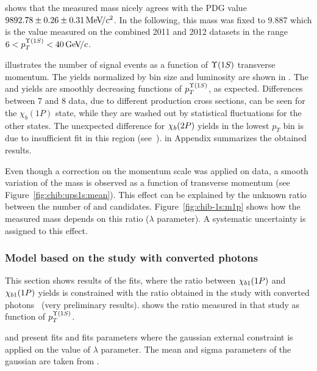  shows that the measured \chiboneOneP mass
nicely agrees with the PDG value $9892.78 \pm 0.26 \pm 0.31 {\mathrm{\,Me\kern -0.1em V\!/}c^2}$. In
the following, this mass was fixed to 9.887 \gevcc which is the value 
measured on the combined 2011 and 2012 datasets in the range $6<p_T^{\Y1S}<40\gevc$.


 illustrates the number of signal events as
a function of $\Y1S$ transverse momentum. The yields
normalized by bin size and luminosity are shown in
. The \chibOneP and \chibThreeP yields
are smoothly decreasing functions of $p_T^{\Y1S}$, as expected. Differences between 7 and 8\tev
data, due to different production cross sections, can be seen for the
$\chi_b(1P)$ state, while they are washed out by statistical fluctuations for
the other states. The unexpected difference for $\chi_{b}(2P)$ yields in the lowest
$p_T$ bin is due to insufficient fit in this region (see~).
 in Appendix summarizes the
obtained results.



Even though a correction on the momentum scale was applied on data, a smooth variation of the
\chiboneOneP mass is observed as a function of transverse momentum (see
Figure~\ref{fig:chib:ups1s:mean}). This effect can be explained by the unknown
ratio between the number of \chiboneOneP and \chiboneTwoP candidates.
Figure~\ref{fig:chib-1s:m1p} shows how the measured mass depends on this ratio
($\lambda$ parameter). A systematic uncertainty is assigned to this effect.




\subsubsection{Model based on the study with converted photons}
This section shows results of the fits, where the ratio between
$\chi_{b 1}(1P)$ and $\chi_{b 1}(1P)$ yields is constrained with the ratio obtained
in the study with converted photons~\cite{Lespinasse:1664279} (very preliminary
results).  shows the ratio measured in that study as function
of $p_T^{\Y1S}$.



 and  present fits  and 
fits parameters where the gaussian external constraint is applied on  the value of $\lambda$ parameter.
The mean and sigma parameters of the gaussian are taken from .

